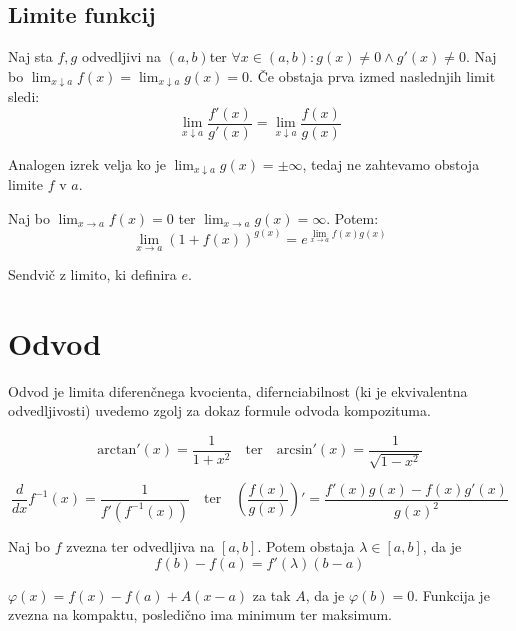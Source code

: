 \documentclass[12pt, a4paper, unicode]{article}
\begin{document}
\newpage
\subsection{Limite funkcij}
\begin{izrek}
Naj sta $f,g$ odvedljivi na $(a,b)$\footnotemark[2] ter $\forall x \in (a,b): g(x) \neq 0 \land g'(x) \neq 0$. Naj bo $\lim_{x \downarrow a} f(x) = \lim_{x \downarrow a} g(x) = 0$. Če obstaja prva izmed naslednjih limit sledi:\[\lim_{x \downarrow a} \frac{f'(x)}{g'(x)} = \lim_{x \downarrow a} \frac{f(x)}{g(x)}\]
\end{izrek}
Analogen izrek velja ko je $\lim_{x \downarrow a} g(x) = \pm \infty$, tedaj ne zahtevamo obstoja limite $f$ v $a$.

\begin{izrek}
Naj bo $\lim_{x \to a} f(x) = 0$ ter $\lim_{x \to a} g(x) = \infty$. Potem: \[\lim_{x \to a} \left( 1 + f(x)\right)^{g(x)} = e^{\lim_{x \to a} f(x)g(x)}\]
\end{izrek}
\begin{oris}
Sendvič z limito, ki definira $e$.
\end{oris}

\newpage
\section{Odvod}
\begin{definicija}
Odvod je limita diferenčnega kvocienta, difernciabilnost (ki je ekvivalentna odvedljivosti) uvedemo zgolj za dokaz formule odvoda kompozituma.
\end{definicija}

\begin{naloga}
\[\text{arctan}'(x) = \frac{1}{1+x^2} \quad \text{ter} \quad \text{arcsin}'(x) = \frac{1}{\sqrt{1-x^2}}\]
\end{naloga}

\begin{lema}
\[\frac{d}{dx} f^{-1}(x) = \frac{1}{f'(f^{-1}(x))} \quad \text{ter} \quad \left(\frac{f(x)}{g(x)}\right)' = \frac{f'(x)g(x)- f(x)g'(x)}{g(x)^2}\]
\end{lema}

\begin{izrek}[Lagrange]
Naj bo $f$ zvezna ter odvedljiva na $[a,b]$. Potem obstaja $\lambda \in [a,b]$, da je \[f(b) - f(a) = f'(\lambda)(b-a)\]
\end{izrek}
\begin{oris}
$\varphi(x) = f(x) - f(a) + A(x-a)$ za tak $A$, da je $\varphi(b)=0$. Funkcija je zvezna na kompaktu, posledično ima minimum ter maksimum.
\end{oris}
\end{document}
